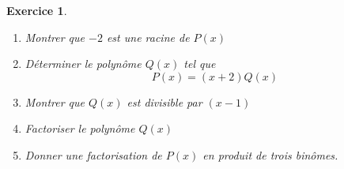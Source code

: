 \documentclass[12pt,a4paper]{article}
\theoremstyle{mystyle}
\newtheorem{exo}{Exercice}
\begin{document}
\begin{multicols*}{2}
\begin{exo}
\begin{enumerate}
    \item Montrer que \(-2\) est une racine de \(P(x)\)
    \item Déterminer le polynôme \(Q(x)\) tel que \[P(x) = (x + 2)Q(x)\]
    \item Montrer que \(Q(x)\) est divisible par \((x - 1)\)
    \item Factoriser le polynôme \(Q(x)\)
    \item Donner une factorisation de \(P(x)\) en produit de trois binômes.
\end{enumerate}
\end{exo}

%



















\end{multicols*}
\end{document}
